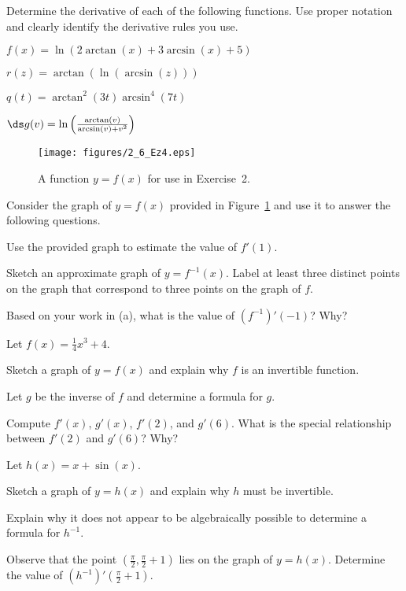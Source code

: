 \begin{exercises} 

\item Determine the derivative of each of the following functions.  Use proper notation and clearly identify the derivative rules you use.
\ba
	\item $f(x) = \ln(2\arctan(x) + 3\arcsin(x) + 5)$
	\item $r(z) = \arctan(\ln(\arcsin(z)))$
	\item $q(t) = \arctan^2(3t) \arcsin^4(7t)$ 
	\item $\ds g(v) =  \ln\left( \frac{\arctan(v)}{\arcsin(v) + v^2} \right)$
\ea

\begin{figure}[h]
\begin{center}
\texttt{[image: figures/2\_6\_Ez4.eps]}
\caption{A function $y = f(x)$ for use in Exercise~2.} \label{F:2.6.Ez4}
\end{center}
\end{figure}

\item Consider the graph of $y = f(x)$ provided in Figure~\ref{F:2.6.Ez4} and use it to answer the following questions.
\ba
	\item Use the provided graph to estimate the value of $f'(1)$.
	\item Sketch an approximate graph of $y = f^{-1}(x)$.  Label at least three distinct points on the graph that correspond to three points on the graph of $f$.
	\item Based on your work in (a), what is the value of $(f^{-1})'(-1)$?  Why?
\ea

\item Let $f(x) = \frac{1}{4}x^3 + 4.$
\ba
	\item Sketch a graph of $y = f(x)$ and explain why $f$ is an invertible function.
	\item Let $g$ be the inverse of $f$ and determine a formula for $g$.
	\item Compute $f'(x)$, $g'(x)$, $f'(2)$, and $g'(6)$.  What is the special relationship between $f'(2)$ and $g'(6)$?  Why?
\ea
\item Let $h(x) = x + \sin(x)$.
\ba
	\item Sketch a graph of $y = h(x)$ and explain why $h$ must be invertible.
	\item Explain why it does not appear to be algebraically possible to determine a formula for $h^{-1}$.
	\item Observe that the point $(\frac{\pi}{2}, \frac{\pi}{2} + 1)$ lies on the graph of $y = h(x)$.  Determine the value of $(h^{-1})'(\frac{\pi}{2} + 1)$.
\ea


\end{exercises}
\afterexercises